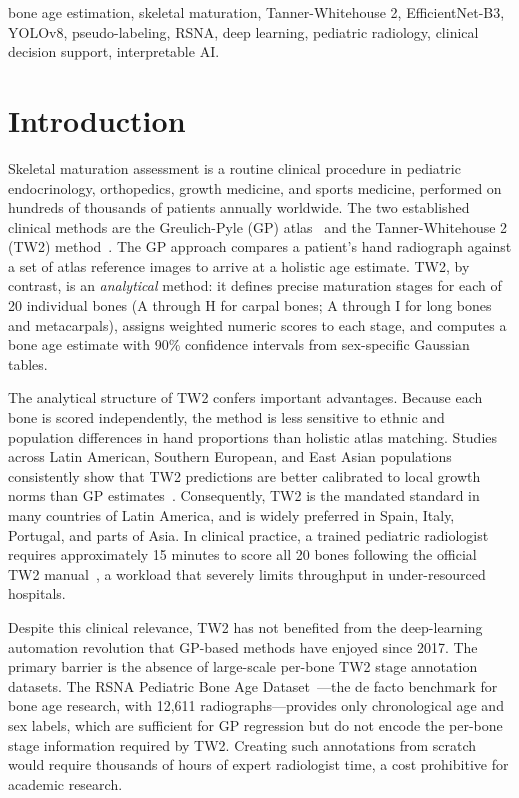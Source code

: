 \documentclass[journal]{IEEEtran}
\begin{document}
\begin{IEEEkeywords}
bone age estimation, skeletal maturation, Tanner-Whitehouse 2,
EfficientNet-B3, YOLOv8, pseudo-labeling, RSNA, deep learning,
pediatric radiology, clinical decision support, interpretable AI.
\end{IEEEkeywords}

\section{Introduction}
\label{sec:intro}

Skeletal maturation assessment is a routine clinical procedure in
pediatric endocrinology, orthopedics, growth medicine, and
sports medicine, performed on hundreds of thousands of patients
annually worldwide.
The two established clinical methods are the Greulich-Pyle (GP)
atlas~\cite{greulich1959} and the Tanner-Whitehouse 2 (TW2)
method~\cite{tanner1975,tanner1983}.
The GP approach compares a patient's hand radiograph against a set
of atlas reference images to arrive at a holistic age estimate.
TW2, by contrast, is an \textit{analytical} method: it defines
precise maturation stages for each of 20 individual bones
(A through H for carpal bones; A through I for long bones and
metacarpals), assigns weighted numeric scores to each stage, and
computes a bone age estimate with 90\% confidence intervals from
sex-specific Gaussian tables.

The analytical structure of TW2 confers important advantages.
Because each bone is scored independently, the method is less
sensitive to ethnic and population differences in hand proportions
than holistic atlas matching.
Studies across Latin American, Southern European, and East
Asian populations consistently show that TW2 predictions are better
calibrated to local growth norms than GP estimates~\cite{tanner1983}.
Consequently, TW2 is the mandated standard in many countries of Latin
America, and is widely preferred in Spain, Italy, Portugal, and parts
of Asia.
In clinical practice, a trained pediatric radiologist requires
approximately 15 minutes to score all 20 bones following the official
TW2 manual~\cite{tanner1983}, a workload that severely limits
throughput in under-resourced hospitals.

Despite this clinical relevance, TW2 has not benefited from the
deep-learning automation revolution that GP-based methods have
enjoyed since 2017.
The primary barrier is the absence of large-scale per-bone TW2 stage
annotation datasets.
The RSNA Pediatric Bone Age Dataset~\cite{halabi2019}—the de facto
benchmark for bone age research, with 12,611 radiographs—provides
only chronological age and sex labels, which are sufficient for GP
regression but do not encode the per-bone stage information
required by TW2.
Creating such annotations from scratch would require thousands of
hours of expert radiologist time, a cost prohibitive for academic
research.
\end{document}
